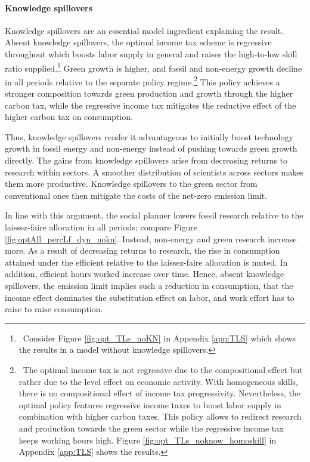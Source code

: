 \paragraph{Knowledge spillovers}
 Knowledge spillovers are an essential model ingredient explaining the result. Absent knowledge spillovers, the optimal income tax scheme is regressive throughout which boosts labor supply in general and raises the high-to-low skill ratio supplied.\footnote{\ Consider Figure \ref{fig:opt_TLs_noKN} in Appendix \ref{app:TLS} which shows the results in a model without knowledge spillovers.} Green growth is higher, and fossil and non-energy growth decline in all periods relative to the separate policy regime.\footnote{\  The optimal income tax is not regressive due to the compositional effect but rather due to the level effect on economic activity. With homogeneous skills, there is no compositional effect of income tax progressivity. Nevertheless, the optimal policy features regressive income taxes to boost labor supply in combination with higher carbon taxes. This policy allows to redirect research and production towards the green sector while the regressive income tax keeps working hours high. Figure \ref{fig:opt_TLs_noknow_homoskill} in Appendix \ref{app:TLS} shows the results. 
} This policy achieves a stronger composition towards green production and growth through the higher carbon tax, while the regressive income tax mitigates the reductive effect of the higher carbon tax on consumption. 

Thus, knowledge spillovers render it advantageous to initially boost technology growth in fossil energy and non-energy instead of pushing towards green growth directly.
The gains from knowledge spillovers arise from decreasing returns to research within sectors. A smoother distribution of scientists across sectors makes them more productive. Knowledge spillovers to the green sector from conventional ones then mitigate the costs of the net-zero emission limit. 


In line with this argument, the social planner lowers fossil research relative to the laissez-faire allocation in all periods; compare Figure \ref{fig:optAll_percLf_dyn_nokn}. Instead, non-energy and green research increase more. As a result of decreasing returns to research, the rise in consumption attained under the efficient relative to the laissez-faire allocation is muted. In addition, efficient hours worked increase over time.  Hence, absent knowledge spillovers, the emission limit implies such a reduction in consumption, that the income effect dominates the substitution effect on labor, and work effort has to raise to raise consumption.


